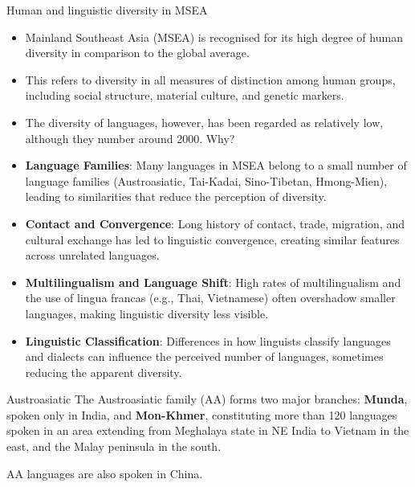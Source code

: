 \documentclass{beamer}
\begin{document}
\begin{frame}{Human and linguistic diversity in MSEA}
\begin{itemize}

\item Mainland Southeast Asia (MSEA) is recognised for its high degree of
human diversity in comparison to the global average.

\item This refers to diversity in all measures of distinction among human groups, including social structure, material culture, and genetic markers.

\item The diversity of languages, however, has been regarded as relatively
low, although they number around 2000. Why?
\end{itemize}

\end{frame}

\begin{frame}
  \begin{itemize}
    \item \textbf{Language Families}: Many languages in MSEA belong to a small number of language families (Austroasiatic, Tai-Kadai, Sino-Tibetan, Hmong-Mien), leading to similarities that reduce the perception of diversity.
    \item \textbf{Contact and Convergence}: Long history of contact, trade, migration, and cultural exchange has led to linguistic convergence, creating similar features across unrelated languages.
    \item \textbf{Multilingualism and Language Shift}: High rates of multilingualism and the use of lingua francas (e.g., Thai, Vietnamese) often overshadow smaller languages, making linguistic diversity less visible.
    \item \textbf{Linguistic Classification}: Differences in how linguists classify languages and dialects can influence the perceived number of languages, sometimes reducing the apparent diversity.
\end{itemize}
\end{frame}


\begin{frame}{Austroasiatic}
The Austroasiatic family (AA) forms two major 
branches: \textbf{Munda}, spoken only in India, and \textbf{Mon-Khmer}, constituting more than 120 languages spoken in an area
extending from Meghalaya state in NE India to Vietnam in the east, and
the Malay peninsula in the south.

AA languages are also spoken in China.
\end{frame}
\end{document}
